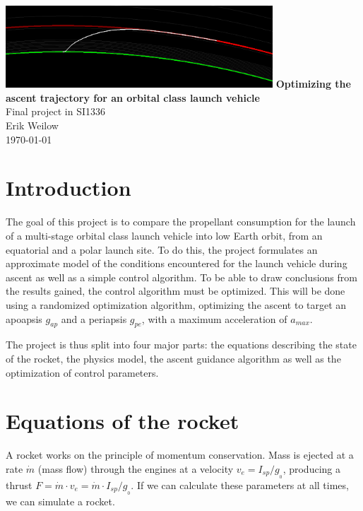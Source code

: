 \documentclass[11pt]{article}
\begin{document}
\begin{titlepage}
  \centering
  \vfill
  \vfill
  \includegraphics[width=0.75\textwidth]{./220km.png}
  \vskip3cm
  {\Large
  \textbf{Optimizing the ascent trajectory for an orbital class launch vehicle}\\
  \vskip0.25cm
  Final project in SI1336\\
      \vskip1cm
      Erik Weilow\\
      \vskip0.5cm
      \today\\
  }    
  \vfill
  \vfill
\end{titlepage}
\newpage

\section{Introduction}
The goal of this project is to compare the propellant consumption for the launch of a multi-stage orbital class launch vehicle into low Earth orbit, from an equatorial and a polar launch site.
To do this, the project formulates an approximate model of the conditions encountered for the launch vehicle during ascent as well as a simple control algorithm.
To be able to draw conclusions from the results gained, the control algorithm must be optimized. 
This will be done using a randomized optimization algorithm, optimizing the ascent to target an apoapsis $g_{ap}$ and a periapsis $g_{pe}$, with a maximum acceleration of $a_{max}$. 

The project is thus split into four major parts: the equations describing the state of the rocket, the physics model, the ascent guidance algorithm as well as the optimization of control parameters.

\section{Equations of the rocket}
A rocket works on the principle of momentum conservation. Mass is ejected at a rate $\dot{m}$ (mass flow) through the engines at a velocity $v_{e} = I_{sp} / g_{_0}$, 
producing a thrust $F = \dot{m} \cdot v_{e} = \dot{m} \cdot I_{sp} / g_{_0}$. If we can calculate these parameters at all times, we can simulate a rocket.
\end{document}

